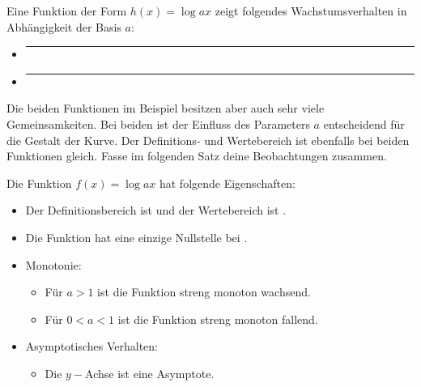 \documentclass[11pt,oneside]{article}
\begin{document}
	\begin{satz}[Wachstumsverhalten]
		Eine Funktion der Form $h(x)=\log{a}{x}$ zeigt folgendes Wachstumsverhalten in Abhängigkeit der Basis $a$:
		\begin{itemize}
			\item \rule{10cm}{1pt}
			\item \rule{10cm}{1pt}
		\end{itemize}
	\end{satz}
	Die beiden Funktionen im Beispiel besitzen aber auch sehr viele Gemeinsamkeiten. Bei beiden ist der Einfluss des Parameters $a$ entscheidend für die Gestalt der Kurve. Der Definitions- und Wertebereich ist ebenfalls bei beiden Funktionen gleich. Fasse im folgenden Satz deine Beobachtungen zusammen.
	\begin{satz}[Eigenschaften]
		Die Funktion $f(x)=\log{a}{x}$ hat folgende Eigenschaften:
		\begin{itemize}
			\item Der Definitionsbereich ist  und der Wertebereich ist .
			\item Die Funktion hat eine einzige Nullstelle bei .
			\item Monotonie:\begin{itemize}
				\item Für $a>1$ ist die Funktion streng monoton wachsend.
				\item Für $0<a<1$ ist die Funktion streng monoton fallend.\end{itemize}
			\item Asymptotisches Verhalten:\begin{itemize}
				\item Die $y-$Achse ist eine Asymptote.\end{itemize}
		\end{itemize}
	\end{satz}
\end{document}
